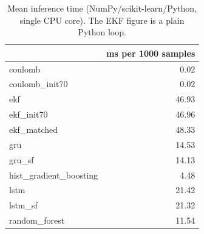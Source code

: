 \begin{table}[htbp]\centering\footnotesize
\begin{tabular}{lr}
\toprule
 & ms per 1000 samples \\
\midrule
coulomb & 0.02 \\
coulomb\_init70 & 0.02 \\
ekf & 46.93 \\
ekf\_init70 & 46.96 \\
ekf\_matched & 48.33 \\
gru & 14.53 \\
gru\_sf & 14.13 \\
hist\_gradient\_boosting & 4.48 \\
lstm & 21.42 \\
lstm\_sf & 21.32 \\
random\_forest & 11.54 \\
\bottomrule
\end{tabular}
\caption{Mean inference time (NumPy/scikit-learn/Python, single CPU core). The EKF figure is a plain Python loop.}\label{tab:timing}
\end{table}

